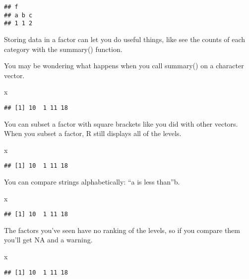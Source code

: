 \documentclass[
]{article}
\newenvironment{Shaded}{\begin{snugshade}}{\end{snugshade}}
\newcommand{\NormalTok}[1]{#1}
\begin{document}
\begin{verbatim}
## f
## a b c 
## 1 1 2
\end{verbatim}

Storing data in a factor can let you do useful things, like see the
counts of each category with the summary() function.

You may be wondering what happens when you call summary() on a character
vector.

\begin{Shaded}
\begin{Highlighting}[]
\NormalTok{x}
\end{Highlighting}
\end{Shaded}

\begin{verbatim}
## [1] 10  1 11 18
\end{verbatim}

You can subset a factor with square brackets like you did with other
vectors. When you subset a factor, R still displays all of the levels.

\begin{Shaded}
\begin{Highlighting}[]
\NormalTok{x}
\end{Highlighting}
\end{Shaded}

\begin{verbatim}
## [1] 10  1 11 18
\end{verbatim}

You can compare strings alphabetically: ``a is less than''b.

\begin{Shaded}
\begin{Highlighting}[]
\NormalTok{x}
\end{Highlighting}
\end{Shaded}

\begin{verbatim}
## [1] 10  1 11 18
\end{verbatim}

The factors you've seen have no ranking of the levels, so if you compare
them you'll get NA and a warning.

\begin{Shaded}
\begin{Highlighting}[]
\NormalTok{x}
\end{Highlighting}
\end{Shaded}

\begin{verbatim}
## [1] 10  1 11 18
\end{verbatim}
\end{document}
